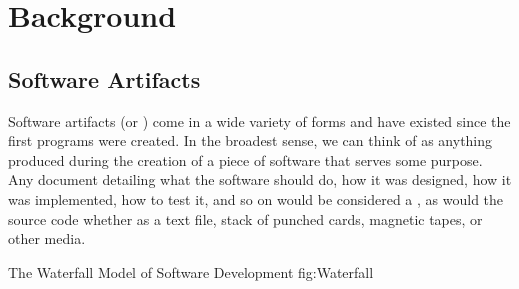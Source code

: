 \chapter{Background}
\section{Software Artifacts}
\label{sec:sfs}

Software artifacts (or \sfs{}) come in a wide variety of forms and have existed 
since the first programs were created. In the broadest sense, we can think of 
\sfs{} as anything produced during the creation of a piece of software that 
serves some purpose. Any document detailing what the software should do, how it 
was designed, how it was implemented, how to test it, and so on would be 
considered a \sf{}, as would the source code whether as a text file, stack of 
punched cards, magnetic tapes, or other media.


{The Waterfall Model of Software Development}
{fig:Waterfall}

